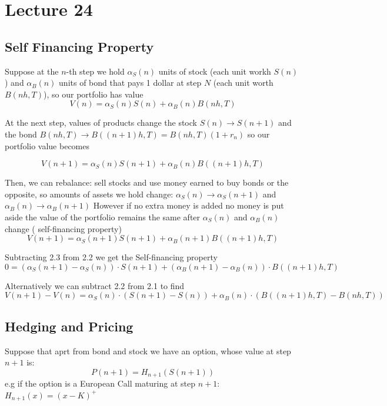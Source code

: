 \documentclass[oneside]{book}
\begin{document}
\section{Lecture 24}
\subsection{Self Financing Property}
Suppose at the $n$-th step we hold $\alpha_S(n)$ units of stock
(each unit workh $S(n)$) and $\alpha_B(n)$ units of bond that pays
1 dollar at step $N$ (each unit worth $B(nh, T)$), so our portfolio
has value
\begin{equation}
    V(n) = \alpha_S(n)S(n) + \alpha_B(n)B(nh, T)
\end{equation}

At the next step, values of products change the stock $S(n) \longrightarrow S(n+1)$
and the bond $B(nh, T) \longrightarrow B((n+1)h, T) = B(nh,T)(1+r_n)$ so our
portfolio value becomes

\begin{equation}
    V(n+1) = \alpha_S(n)S(n+1) + \alpha_B(n)B((n+1)h, T)
\end{equation}

Then, we can rebalance: sell stocks and use money earned to buy bonds
or the opposite, so amounts of assets we hold change:
$\alpha_S(n) \rightarrow \alpha_S(n+1)$ and
$\alpha_B(n) \rightarrow \alpha_B(n+1)$
However if no extra money is added no money is put aside
the value of the portfolio remains the same after $\alpha_S(n)$ and
$\alpha_B(n)$ change ({\color{red} self-financing property})
\begin{equation}
    V(n+1) = \alpha_S(n+1)S(n+1) + \alpha_B(n+1)B((n+1)h, T)
\end{equation}

Subtracting 2.3 from 2.2 we get the {\color{red} Self-financing property}
\begin{equation}
    0 = (\alpha_S(n+1) - \alpha_S(n))\cdot S(n+1) + (\alpha_B(n+1) - \alpha_B(n))\cdot B((n+1)h, T)
\end{equation}

Alternatively we can subtract 2.2 from 2.1 to find
\begin{equation*}
    V(n+1) - V(n) = \alpha_S(n) \cdot (S(n+1) - S(n)) + \alpha_B(n) \cdot (B((n+1)h, T) - B(nh, T))
\end{equation*}
\subsection{Hedging and Pricing}
Suppose that aprt from bond and stock we have an option, whose value at step
$n+1$ is:
\begin{equation*}
    P(n+1) = H_{n+1}(S(n+1))
\end{equation*}
e.g if the option is a European Call maturing at step $n+1$: $H_{n+1}(x) = (x-K)^+$
\end{document}
